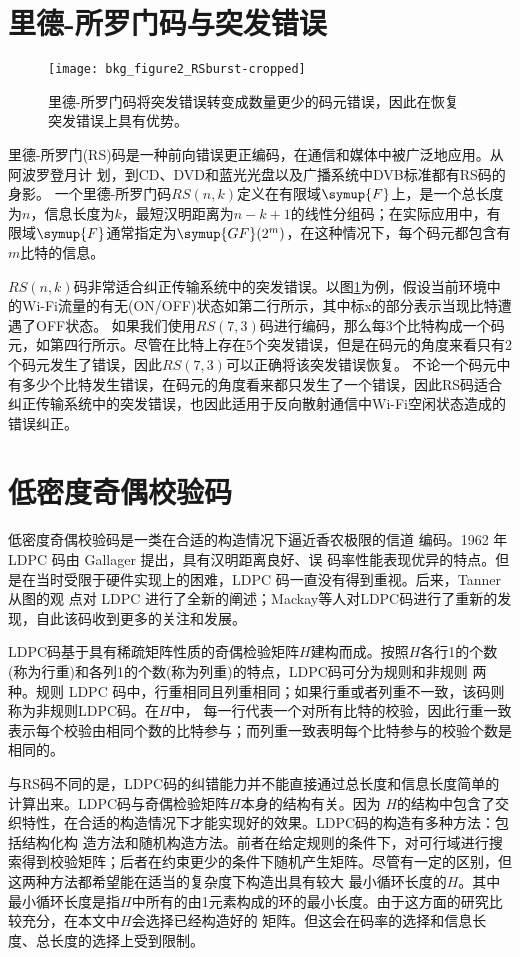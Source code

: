 \section{里德-所罗门码与突发错误}
\begin{figure}
	\centering
	\texttt{[image: bkg\_figure2\_RSburst-cropped]}
	\caption{里德-所罗门码将突发错误转变成数量更少的码元错误，因此在恢复突发错误上具有优势。}
	\label{fig:rscode}
\end{figure}

里德-所罗门(RS)码是一种前向错误更正编码，在通信和媒体中被广泛地应用。从阿波罗登月计
划，到CD、DVD和蓝光光盘以及广播系统中DVB标准都有RS码的身影。 
一个里德-所罗门码$RS(n,k)$定义在有限域$\symup{F}$上，是一个总长度为$n$，信息长度为$k$，最短汉明距离为$n-k+1$的线性分组码；在实际应用中，有限域$\symup{F}$通常指定为$\symup{GF}(2^m)$，在这种情况下，每个码元都包含有$m$比特的信息。

$RS(n,k)$码非常适合纠正传输系统中的突发错误。以图\ref{fig:rscode}为例，假设当前环境中的Wi-Fi流量的有无(ON/OFF)状态如第二行所示，其中标x的部分表示当现比特遭遇了OFF状态。
如果我们使用$RS(7,3)$码进行编码，那么每3个比特构成一个码元，如第四行所示。尽管在比特上存在5个突发错误，但是在码元的角度来看只有2个码元发生了错误，因此$RS(7,3)$可以正确将该突发错误恢复。
不论一个码元中有多少个比特发生错误，在码元的角度看来都只发生了一个错误，因此RS码适合纠正传输系统中的突发错误，也因此适用于反向散射通信中Wi-Fi空闲状态造成的错误纠正。
\section{低密度奇偶校验码}

低密度奇偶校验码是一类在合适的构造情况下逼近香农极限的信道
编码。1962 年LDPC 码由 Gallager 提出，具有汉明距离良好、误
码率性能表现优异的特点。但是在当时受限于硬件实现上的困难，LDPC 码一直没有得到重视。后来，Tanner 从图的观
点对 LDPC 进行了全新的阐述；Mackay等人对LDPC码进行了重新的发现，自此该码收到更多的关注和发展。


LDPC码基于具有稀疏矩阵性质的奇偶检验矩阵$H$建构而成。按照$H$各行1的个数(称为行重)和各列1的个数(称为列重)的特点，LDPC码可分为规则和非规则
两种。规则 LDPC 码中，行重相同且列重相同；如果行重或者列重不一致，该码则称为非规则LDPC码。在$H$中，
每一行代表一个对所有比特的校验，因此行重一致表示每个校验由相同个数的比特参与；而列重一致表明每个比特参与的校验个数是相同的。

与RS码不同的是，LDPC码的纠错能力并不能直接通过总长度和信息长度简单的计算出来。LDPC码与奇偶检验矩阵$H$本身的结构有关。因为
$H$的结构中包含了交织特性，在合适的构造情况下才能实现好的效果。LDPC码的构造有多种方法：包括结构化构
造方法和随机构造方法。前者在给定规则的条件下，对可行域进行搜索得到校验矩阵；后者在约束更少的条件下随机产生矩阵。尽管有一定的区别，但这两种方法都希望能在适当的复杂度下构造出具有较大
最小循环长度的$H$。其中最小循环长度是指$H$中所有的由1元素构成的环的最小长度。由于这方面的研究比较充分，在本文中$H$会选择已经构造好的
矩阵。但这会在码率的选择和信息长度、总长度的选择上受到限制。